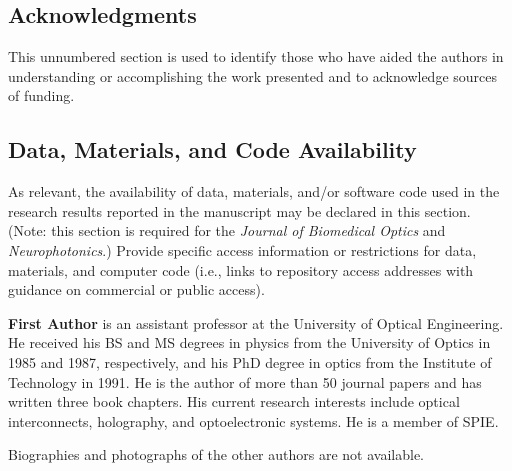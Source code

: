\documentclass[12pt]{spieman}
\begin{document}
\begin{spacing}{2}
\subsection* {Acknowledgments}
This unnumbered section is used to identify those who have aided the authors in understanding or accomplishing the work presented and to acknowledge sources of funding. 

\subsection* {Data, Materials, and Code Availability} 
As relevant, the availability of data, materials, and/or software code used in the research results reported in the manuscript may be declared in this section. (Note: this section is required for the \textit{Journal of Biomedical Optics} and \textit{Neurophotonics}.) Provide specific access information or restrictions for data, materials, and computer code (i.e., links to repository access addresses with guidance on commercial or public access).






\vspace{1ex}
\vspace{2ex}\noindent\textbf{First Author} is an assistant professor at the University of Optical Engineering. He received his BS and MS degrees in physics from the University of Optics in 1985 and 1987, respectively, and his PhD degree in optics from the Institute of Technology in 1991.  He is the author of more than 50 journal papers and has written three book chapters. His current research interests include optical interconnects, holography, and optoelectronic systems. He is a member of SPIE.

\vspace{1ex}
\noindent Biographies and photographs of the other authors are not available.


\listoffigures
\listoftables


\end{spacing}
\end{document}
